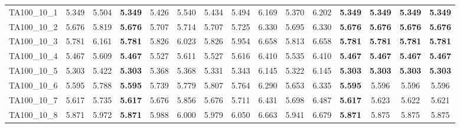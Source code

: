 \begin{tabular}{cc||ccccccccccccc}
TA100\_10\_1       & 5.349            & 5.504            & {\bf 5.349}      & 5.426            & 5.540            & 5.434            & 5.494            & 6.169            & 5.370            & 6.202            & {\bf 5.349}      & {\bf 5.349}      & {\bf 5.349}      & {\bf 5.349}     \\ 
TA100\_10\_2       & 5.676            & 5.819            & {\bf 5.676}      & 5.707            & 5.714            & 5.707            & 5.725            & 6.330            & 5.695            & 6.330            & {\bf 5.676}      & {\bf 5.676}      & {\bf 5.676}      & {\bf 5.676}     \\ 
TA100\_10\_3       & 5.781            & 6.161            & {\bf 5.781}      & 5.826            & 6.023            & 5.826            & 5.954            & 6.658            & 5.813            & 6.658            & {\bf 5.781}      & {\bf 5.781}      & {\bf 5.781}      & {\bf 5.781}     \\ 
TA100\_10\_4       & 5.467            & 5.609            & {\bf 5.467}      & 5.527            & 5.611            & 5.527            & 5.616            & 6.410            & 5.535            & 6.410            & {\bf 5.467}      & {\bf 5.467}      & {\bf 5.467}      & {\bf 5.467}     \\ 
TA100\_10\_5       & 5.303            & 5.422            & {\bf 5.303}      & 5.368            & 5.368            & 5.331            & 5.343            & 6.145            & 5.322            & 6.145            & {\bf 5.303}      & {\bf 5.303}      & {\bf 5.303}      & {\bf 5.303}     \\ 
TA100\_10\_6       & 5.595            & 5.788            & {\bf 5.595}      & 5.739            & 5.779            & 5.807            & 5.764            & 6.290            & 5.653            & 6.335            & {\bf 5.595}      & 5.596            & 5.596            & 5.596           \\ 
TA100\_10\_7       & 5.617            & 5.735            & {\bf 5.617}      & 5.676            & 5.856            & 5.676            & 5.711            & 6.431            & 5.698            & 6.487            & {\bf 5.617}      & 5.623            & 5.622            & 5.621           \\ 
TA100\_10\_8       & 5.871            & 5.972            & {\bf 5.871}      & 5.988            & 6.000            & 5.979            & 6.050            & 6.663            & 5.941            & 6.679            & {\bf 5.871}      & 5.875            & 5.875            & 5.875           \\ 

\end{tabular}

